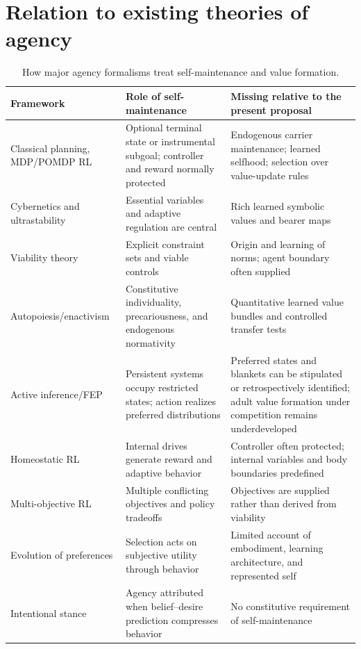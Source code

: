 \documentclass[11pt]{article}
\begin{document}
\section{Relation to existing theories of agency}

\begin{table}[t]
\centering
\footnotesize
\caption{How major agency formalisms treat self-maintenance and value formation.}
\label{tab:agency-models}
\begin{tabularx}{\textwidth}{@{}>{\raggedright\arraybackslash}p{35mm}YY@{}}
\toprule
Framework & Role of self-maintenance & Missing relative to the present proposal \\
\midrule
Classical planning, MDP/POMDP RL
  & Optional terminal state or instrumental subgoal; controller and reward normally protected
  & Endogenous carrier maintenance; learned selfhood; selection over value-update rules \\
Cybernetics and ultrastability
  & Essential variables and adaptive regulation are central
  & Rich learned symbolic values and bearer maps \\
Viability theory
  & Explicit constraint sets and viable controls
  & Origin and learning of norms; agent boundary often supplied \\
Autopoiesis/enactivism
  & Constitutive individuality, precariousness, and endogenous normativity
  & Quantitative learned value bundles and controlled transfer tests \\
Active inference/FEP
  & Persistent systems occupy restricted states; action realizes preferred distributions
  & Preferred states and blankets can be stipulated or retrospectively identified; adult value formation under competition remains underdeveloped \\
Homeostatic RL
  & Internal drives generate reward and adaptive behavior
  & Controller often protected; internal variables and body boundaries predefined \\
Multi-objective RL
  & Multiple conflicting objectives and policy tradeoffs
  & Objectives are supplied rather than derived from viability \\
Evolution of preferences
  & Selection acts on subjective utility through behavior
  & Limited account of embodiment, learning architecture, and represented self \\
Intentional stance
  & Agency attributed when belief--desire prediction compresses behavior
  & No constitutive requirement of self-maintenance \\
\bottomrule
\end{tabularx}
\end{table}
\end{document}
